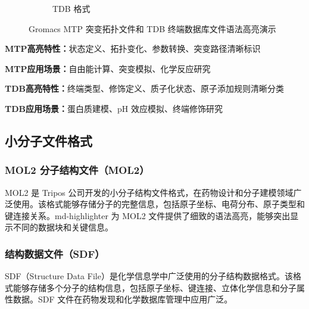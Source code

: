 \begin{figure}[!h]
\begin{subfigure}[c]{0.49\textwidth}
        \caption{TDB 格式}
        \label{fig:tdb-highlighting}
    \end{subfigure}
    \caption{Gromacs MTP 突变拓扑文件和 TDB 终端数据库文件语法高亮演示}
    \label{fig:mtp-tdb-highlighting}
\end{figure}

\textbf{MTP高亮特性：}状态定义、拓扑变化、参数转换、突变路径清晰标识

\textbf{MTP应用场景：}自由能计算、突变模拟、化学反应研究

\textbf{TDB高亮特性：}终端类型、修饰定义、质子化状态、原子添加规则清晰分类

\textbf{TDB应用场景：}蛋白质建模、pH 效应模拟、终端修饰研究

\subsection{小分子文件格式}

\subsubsection{MOL2 分子结构文件（MOL2）}

MOL2 是 Tripos 公司开发的小分子结构文件格式，在药物设计和分子建模领域广泛使用。该格式能够存储分子的完整信息，包括原子坐标、电荷分布、原子类型和键连接关系。md-highlighter 为 MOL2 文件提供了细致的语法高亮，能够突出显示不同的数据块和关键信息。

\subsubsection{结构数据文件（SDF）}

SDF（Structure Data File）是化学信息学中广泛使用的分子结构数据格式。该格式能够存储多个分子的结构信息，包括原子坐标、键连接、立体化学信息和分子属性数据。SDF 文件在药物发现和化学数据库管理中应用广泛。

